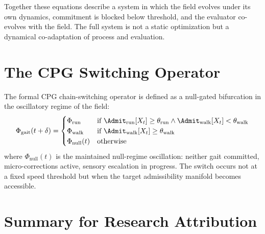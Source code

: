 \documentclass[11pt,oneside]{book}
\begin{document}
Together these equations describe a system in which the field evolves under its own dynamics, commitment is blocked below threshold, and the evaluator co-evolves with the field. The full system is not a static optimization but a dynamical co-adaptation of process and evaluation.

\section{The CPG Switching Operator}

The formal CPG chain-switching operator is defined as a null-gated bifurcation in the oscillatory regime of the field:
\begin{equation}
    \Phi_{\mathrm{gait}}(t+\delta) =
    \begin{cases}
        \Phi_{\mathrm{run}} & \text{if } \Admit_{\mathrm{run}}[X_t] \ge \theta_{\mathrm{run}} \wedge \Admit_{\mathrm{walk}}[X_t] < \theta_{\mathrm{walk}} \\
        \Phi_{\mathrm{walk}} & \text{if } \Admit_{\mathrm{walk}}[X_t] \ge \theta_{\mathrm{walk}} \\
        \Phi_{\mathrm{null}}(t) & \text{otherwise}
    \end{cases}
\end{equation}
where $\Phi_{\mathrm{null}}(t)$ is the maintained null-regime oscillation: neither gait committed, micro-corrections active, sensory escalation in progress. The switch occurs not at a fixed speed threshold but when the target admissibility manifold becomes accessible.

\section{Summary for Research Attribution}
\end{document}

